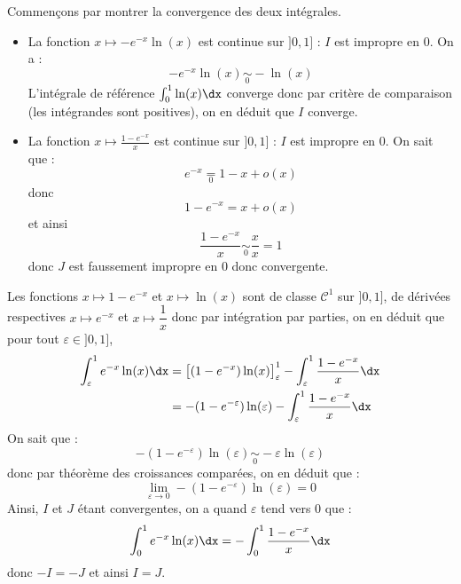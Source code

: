 \documentclass[a4paper,10pt]{report}
\begin{document}
\corr Commençons par montrer la convergence des deux intégrales.

\begin{itemize}
\item La fonction $x \mapsto -e^{-x} \ln(x)$ est continue sur $]0,1]$ : $I$ est impropre en $0$. On a :
$$  -e^{-x} \ln(x) \underset{0}{\sim} -\ln(x)$$
L'intégrale de référence $\int_0^1 \ln(x) \dx$ converge donc par critère de comparaison (les intégrandes sont positives), on en déduit que $I$ converge.
\item La fonction $x \mapsto \frac{1-e^{-x}}{x}$ est continue sur $]0,1]$ : $I$ est impropre en $0$. On sait que :
$$ e^{-x} \underset{0}{=} 1-x + o(x) $$
donc 
$$ 1-e^{-x} = x + o(x)$$
et ainsi 
$$ \frac{1-e^{-x}}{x} \underset{0}{\sim} \dfrac{x}{x}= 1$$
donc $J$ est faussement impropre en $0$ donc convergente.
\end{itemize}
 Les fonctions $x \mapsto 1-e^{-x}$ et $x \mapsto \ln(x)$ sont de classe $\mathcal{C}^1$ sur $]0,1]$, de dérivées respectives $x \mapsto e^{-x}$ et $x \mapsto \dfrac{1}{x}$ donc par intégration par parties, on en déduit que pour tout $\varepsilon \in ]0,1]$,
\begin{align*}
\int_{\varepsilon}^1 e^{-x} \ln(x) \dx & = \left[(1-e^{-x}) \ln(x) \right]_{\varepsilon}^1  - \int_{\varepsilon}^1 \dfrac{1-e^{-x}}{x} \dx \\
& = - (1-e^{-\varepsilon}) \ln(\varepsilon)  - \int_{\varepsilon}^1 \dfrac{1-e^{-x}}{x} \dx \\
\end{align*}
On sait que :
$$ - (1-e^{-\varepsilon}) \ln(\varepsilon) \underset{0}{\sim} - \varepsilon \ln(\varepsilon)$$
donc par théorème des croissances comparées, on en déduit que :
$$ \lim_{\varepsilon \rightarrow 0}  - (1-e^{-\varepsilon}) \ln(\varepsilon) = 0$$
Ainsi, $I$ et $J$ étant convergentes, on a quand $\varepsilon$ tend vers $0$ que :
$$ \int_{0}^1 e^{-x} \ln(x) \dx =  - \int_{0}^1 \dfrac{1-e^{-x}}{x} \dx $$
donc $-I=-J$ et ainsi $I=J$.
\end{document}

